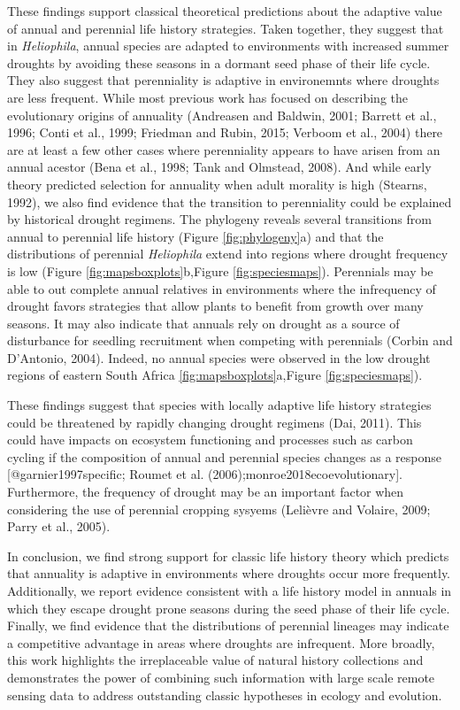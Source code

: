 \documentclass[man,floatsintext]{apa6}
\theoremstyle{definition}
\theoremstyle{definition}
\theoremstyle{definition}
\theoremstyle{remark}
\begin{document}
These findings support classical theoretical predictions about the
adaptive value of annual and perennial life history strategies. Taken
together, they suggest that in \emph{Heliophila}, annual species are
adapted to environments with increased summer droughts by avoiding these
seasons in a dormant seed phase of their life cycle. They also suggest
that perenniality is adaptive in environemnts where droughts are less
frequent. While most previous work has focused on describing the
evolutionary origins of annuality (Andreasen and Baldwin, 2001; Barrett
et al., 1996; Conti et al., 1999; Friedman and Rubin, 2015; Verboom et
al., 2004) there are at least a few other cases where perenniality
appears to have arisen from an annual acestor (Bena et al., 1998; Tank
and Olmstead, 2008). And while early theory predicted selection for
annuality when adult morality is high (Stearns, 1992), we also find
evidence that the transition to perenniality could be explained by
historical drought regimens. The phylogeny reveals several transitions
from annual to perennial life history (Figure \ref{fig:phylogeny}a) and
that the distributions of perennial \emph{Heliophila} extend into
regions where drought frequency is low (Figure
\ref{fig:mapsboxplots}b,Figure \ref{fig:speciesmaps}). Perennials may be
able to out complete annual relatives in environments where the
infrequency of drought favors strategies that allow plants to benefit
from growth over many seasons. It may also indicate that annuals rely on
drought as a source of disturbance for seedling recruitment when
competing with perennials (Corbin and D'Antonio, 2004). Indeed, no
annual species were observed in the low drought regions of eastern South
Africa \ref{fig:mapsboxplots}a,Figure \ref{fig:speciesmaps}).

These findings suggest that species with locally adaptive life history
strategies could be threatened by rapidly changing drought regimens
(Dai, 2011). This could have impacts on ecosystem functioning and
processes such as carbon cycling if the composition of annual and
perennial species changes as a response {[}@garnier1997specific; Roumet
et al. (2006);monroe2018ecoevolutionary{]}. Furthermore, the frequency
of drought may be an important factor when considering the use of
perennial cropping sysyems (Lelièvre and Volaire, 2009; Parry et al.,
2005).

In conclusion, we find strong support for classic life history theory
which predicts that annuality is adaptive in environments where droughts
occur more frequently. Additionally, we report evidence consistent with
a life history model in annuals in which they escape drought prone
seasons during the seed phase of their life cycle. Finally, we find
evidence that the distributions of perennial lineages may indicate a
competitive advantage in areas where droughts are infrequent. More
broadly, this work highlights the irreplaceable value of natural history
collections and demonstrates the power of combining such information
with large scale remote sensing data to address outstanding classic
hypotheses in ecology and evolution.
\end{document}

